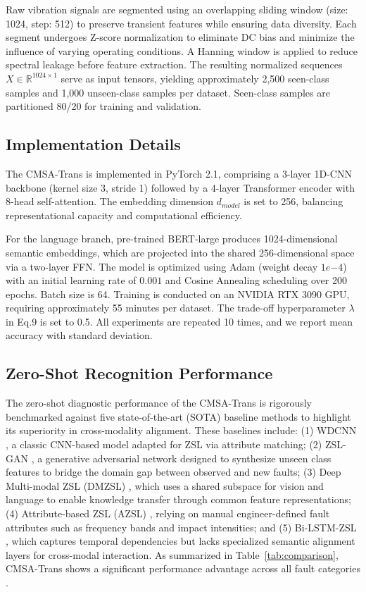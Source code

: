 Raw vibration signals are segmented using an overlapping sliding window (size: 1024, step: 512) to preserve transient features while ensuring data diversity. Each segment undergoes Z-score normalization to eliminate DC bias and minimize the influence of varying operating conditions. A Hanning window is applied to reduce spectral leakage before feature extraction. The resulting normalized sequences $X \in \mathbb{R}^{1024 \times 1}$ serve as input tensors, yielding approximately 2,500 seen-class samples and 1,000 unseen-class samples per dataset. Seen-class samples are partitioned 80/20 for training and validation.

\subsection{Implementation Details}
The CMSA-Trans is implemented in PyTorch 2.1, comprising a 3-layer 1D-CNN backbone (kernel size 3, stride 1) followed by a 4-layer Transformer encoder with 8-head self-attention. The embedding dimension $d_{model}$ is set to 256, balancing representational capacity and computational efficiency.

For the language branch, pre-trained BERT-large produces 1024-dimensional semantic embeddings, which are projected into the shared 256-dimensional space via a two-layer FFN. The model is optimized using Adam (weight decay $1e{-4}$) with an initial learning rate of $0.001$ and Cosine Annealing scheduling over 200 epochs. Batch size is 64. Training is conducted on an NVIDIA RTX 3090 GPU, requiring approximately 55 minutes per dataset. The trade-off hyperparameter $\lambda$ in Eq.9 is set to 0.5. All experiments are repeated 10 times, and we report mean accuracy with standard deviation.


\subsection{Zero-Shot Recognition Performance}
The zero-shot diagnostic performance of the CMSA-Trans is rigorously benchmarked against five state-of-the-art (SOTA) baseline methods to highlight its superiority in cross-modality alignment. These baselines include: (1) WDCNN \cite{zhang2017new}, a classic CNN-based model adapted for ZSL via attribute matching; (2) ZSL-GAN \cite{xian2019fvaegan}, a generative adversarial network designed to synthesize unseen class features to bridge the domain gap between observed and new faults; (3) Deep Multi-modal ZSL (DMZSL) \cite{schonfeld2019generalized}, which uses a shared subspace for vision and language to enable knowledge transfer through common feature representations; (4) Attribute-based ZSL (AZSL) \cite{lampert2014attribute}, relying on manual engineer-defined fault attributes such as frequency bands and impact intensities; and (5) Bi-LSTM-ZSL \cite{chen2019bearing}, which captures temporal dependencies but lacks specialized semantic alignment layers for cross-modal interaction. As summarized in Table~\ref{tab:comparison}, CMSA-Trans shows a significant performance advantage across all fault categories \cite{li2022zero, lu2017deep}.

